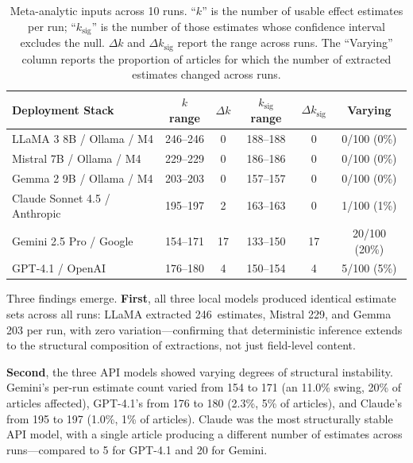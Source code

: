 \documentclass[11pt]{article}
\newenvironment{fittab}{\begin{lrbox}{\fittabbox}}{\end{lrbox}%
  \ifdim\wd\fittabbox>\linewidth\resizebox{\linewidth}{!}{\usebox{\fittabbox}}\else\usebox{\fittabbox}\fi}
\begin{document}
\begin{table}[htbp]
\centering
\caption{Meta-analytic inputs across 10 runs. ``$k$'' is the number of usable effect estimates per run; ``$k_{\text{sig}}$'' is the number of those estimates whose confidence interval excludes the null. $\Delta k$ and $\Delta k_{\text{sig}}$ report the range across runs. The ``Varying'' column reports the proportion of articles for which the number of extracted estimates changed across runs.}
\label{tab:meta}
\begin{fittab}\begin{tabular}{lccccc}
\toprule
\textbf{Deployment Stack} & \textbf{$k$ range} & \textbf{$\Delta k$} & \textbf{$k_{\text{sig}}$ range} & \textbf{$\Delta k_{\text{sig}}$} & \textbf{Varying} \\
\midrule
LLaMA 3 8B / Ollama / M4       & 246--246 & 0  & 188--188 & 0  & 0/100 (0\%) \\
Mistral 7B / Ollama / M4       & 229--229 & 0  & 186--186 & 0  & 0/100 (0\%) \\
Gemma 2 9B / Ollama / M4       & 203--203 & 0  & 157--157 & 0  & 0/100 (0\%) \\
\midrule
Claude Sonnet 4.5 / Anthropic  & 195--197 & 2  & 163--163 & 0  & 1/100 (1\%) \\
Gemini 2.5 Pro / Google        & 154--171 & 17 & 133--150 & 17 & 20/100 (20\%) \\
GPT-4.1 / OpenAI               & 176--180 & 4  & 150--154 & 4  & 5/100 (5\%) \\
\bottomrule
\end{tabular}\end{fittab}
\end{table}

\noindent Three findings emerge.
\textbf{First}, all three local models produced identical estimate sets across all runs: LLaMA extracted 246~estimates, Mistral 229, and Gemma 203 per run, with zero variation---confirming that deterministic inference extends to the structural composition of extractions, not just field-level content.

\textbf{Second}, the three API models showed varying degrees of structural instability.
Gemini's per-run estimate count varied from 154 to 171 (an 11.0\% swing, 20\% of articles affected), GPT-4.1's from 176 to 180 (2.3\%, 5\% of articles), and Claude's from 195 to 197 (1.0\%, 1\% of articles).
Claude was the most structurally stable API model, with a single article producing a different number of estimates across runs---compared to 5 for GPT-4.1 and 20 for Gemini.
\end{document}
